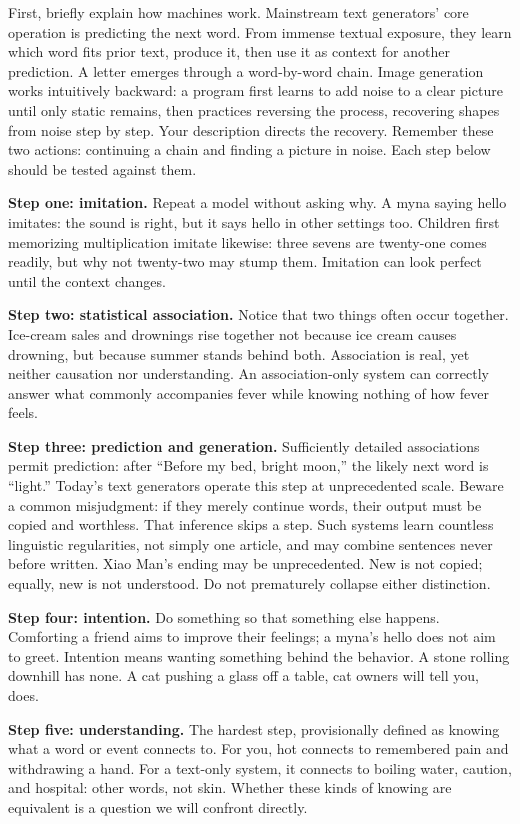 First, briefly explain how machines work. Mainstream text generators' core operation is predicting the next word. From immense textual exposure, they learn which word fits prior text, produce it, then use it as context for another prediction. A letter emerges through a word-by-word chain. Image generation works intuitively backward: a program first learns to add noise to a clear picture until only static remains, then practices reversing the process, recovering shapes from noise step by step. Your description directs the recovery. Remember these two actions: continuing a chain and finding a picture in noise. Each step below should be tested against them.

\textbf{Step one: imitation.} Repeat a model without asking why. A myna saying hello imitates: the sound is right, but it says hello in other settings too. Children first memorizing multiplication imitate likewise: three sevens are twenty-one comes readily, but why not twenty-two may stump them. Imitation can look perfect until the context changes.

\textbf{Step two: statistical association.} Notice that two things often occur together. Ice-cream sales and drownings rise together not because ice cream causes drowning, but because summer stands behind both. Association is real, yet neither causation nor understanding. An association-only system can correctly answer what commonly accompanies fever while knowing nothing of how fever feels.

\textbf{Step three: prediction and generation.} Sufficiently detailed associations permit prediction: after ``Before my bed, bright moon,'' the likely next word is ``light.'' Today's text generators operate this step at unprecedented scale. Beware a common misjudgment: if they merely continue words, their output must be copied and worthless. That inference skips a step. Such systems learn countless linguistic regularities, not simply one article, and may combine sentences never before written. Xiao Man's ending may be unprecedented. New is not copied; equally, new is not understood. Do not prematurely collapse either distinction.

\textbf{Step four: intention.} Do something so that something else happens. Comforting a friend aims to improve their feelings; a myna's hello does not aim to greet. Intention means wanting something behind the behavior. A stone rolling downhill has none. A cat pushing a glass off a table, cat owners will tell you, does.

\textbf{Step five: understanding.} The hardest step, provisionally defined as knowing what a word or event connects to. For you, hot connects to remembered pain and withdrawing a hand. For a text-only system, it connects to boiling water, caution, and hospital: other words, not skin. Whether these kinds of knowing are equivalent is a question we will confront directly.

